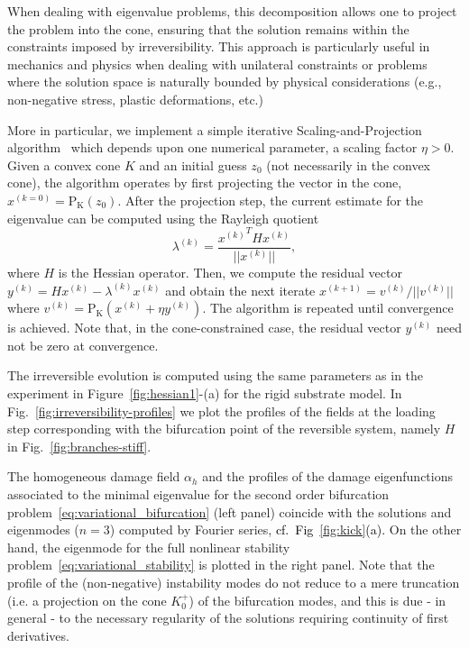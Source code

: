 When dealing with eigenvalue problems, this decomposition allows one to project the problem into the cone, ensuring that the solution remains within the constraints imposed by irreversibility. 
This approach is particularly useful in mechanics and physics when dealing with unilateral constraints or problems where the solution space is naturally bounded by physical considerations (e.g., non-negative stress, plastic deformations, etc.) 

More in particular, we implement a simple iterative Scaling-and-Projection algorithm~\cite{Pinto_da_Costa2010-qv} which depends upon one numerical parameter, a scaling factor $\eta>0$. Given a convex cone  $K$ and an initial guess $z_0$ (not necessarily in the convex cone), the algorithm operates by first projecting the vector in the cone, $x^{(k=0)}= \operatorname{P_K}(z_0)$.  
After the projection step, the current estimate for the eigenvalue can be computed using the Rayleigh quotient
\begin{equation}
    \lambda^{(k)} = \frac{{x^{(k)}}^T H x^{(k)}}{||x^{(k)}||},
\end{equation}
where $H$ is the Hessian operator. Then, we compute the residual vector $y^{(k)} = H x^{(k)} - \lambda^{(k)} x^{(k)}$ and obtain the next iterate $x^{(k+1)} = v^{(k)}/||v^{(k)}||$ where 
$v^{(k)} =\operatorname{P_K} (x^{(k)} + \eta y^{(k)})$.
The algorithm is repeated until convergence is achieved. Note that, in the cone-constrained case, the residual vector $y^{(k)}$ need not be zero at convergence.

The irreversible evolution is computed using the same parameters as in the experiment in Figure~\ref{fig:hessian1}-(a) for the rigid substrate model. In Fig.~\ref{fig:irreversibility-profiles} we plot the profiles of the fields at the loading step corresponding with the bifurcation point of the reversible system, namely $H$ in Fig.~\ref{fig:branches-stiff}.

The homogeneous damage field $\alpha_h$ and the profiles of the damage eigenfunctions associated to the minimal eigenvalue for the second order bifurcation problem~\eqref{eq:variational_bifurcation} (left panel) coincide with the solutions and eigenmodes 
($n=3$) computed by Fourier series, \textcolor{black}{cf.~Fig~\ref{fig:kick}(a).}
On the other hand, the eigenmode for the full nonlinear stability problem~\eqref{eq:variational_stability} is plotted in the right panel.
Note that the profile of the (non-negative) instability modes do not reduce to a mere truncation (i.e. a projection on the cone $K^+_0$) of the bifurcation modes, and this is due - in general - to the necessary regularity of the solutions requiring continuity of first derivatives. 

